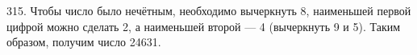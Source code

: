 315. Чтобы число было нечётным, необходимо вычеркнуть 8, наименьшей первой цифрой можно сделать 2, а наименьшей второй --- 4 (вычеркнуть 9 и 5). Таким образом, получим число 24631.\\
